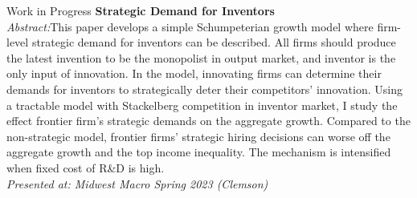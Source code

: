 \documentclass{cv} %
\begin{document}
\begin{rSection}{Work in Progress}
\newpage
\medskip
{\bf Strategic Demand for Inventors} \\
	 \begin{adjustbox}{minipage=0.95\textwidth, right}
		\vspace{0.3em} {\emph{Abstract:}This paper develops a simple Schumpeterian growth model where firm-level strategic demand for inventors can be described.  All firms should produce the latest invention to be the monopolist in output market, and inventor is the only input of innovation.  In the model, innovating firms can determine their demands for inventors to strategically deter their competitors' innovation.  Using a tractable model with Stackelberg competition in inventor market,  I study the effect frontier firm's strategic demands on the aggregate growth.  Compared to the non-strategic model,  frontier firms' strategic hiring decisions can worse off the aggregate growth and the top income inequality.  The mechanism is intensified when fixed cost of R\&D is high.} \\
		\emph{Presented at: Midwest Macro Spring 2023 (Clemson)}
	\end{adjustbox}\\



\end{rSection}
\bigskip
\end{document}
